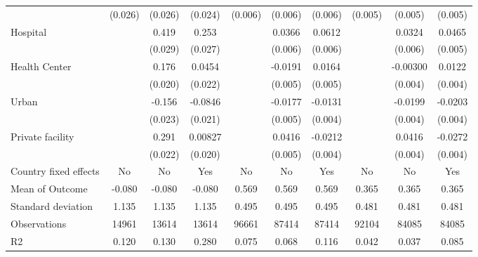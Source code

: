 {\begin{tabular}{l*{9}{c}}
                &  (0.026)         &  (0.026)         &  (0.024)         &  (0.006)         &  (0.006)         &  (0.006)         &  (0.005)         &  (0.005)         &  (0.005)         \\
Hospital        &                  &    0.419\sym{***}&    0.253\sym{***}&                  &   0.0366\sym{***}&   0.0612\sym{***}&                  &   0.0324\sym{***}&   0.0465\sym{***}\\
                &                  &  (0.029)         &  (0.027)         &                  &  (0.006)         &  (0.006)         &                  &  (0.006)         &  (0.005)         \\
Health Center   &                  &    0.176\sym{***}&   0.0454\sym{**} &                  &  -0.0191\sym{***}&   0.0164\sym{***}&                  & -0.00300         &   0.0122\sym{***}\\
                &                  &  (0.020)         &  (0.022)         &                  &  (0.005)         &  (0.005)         &                  &  (0.004)         &  (0.004)         \\
Urban           &                  &   -0.156\sym{***}&  -0.0846\sym{***}&                  &  -0.0177\sym{***}&  -0.0131\sym{***}&                  &  -0.0199\sym{***}&  -0.0203\sym{***}\\
                &                  &  (0.023)         &  (0.021)         &                  &  (0.005)         &  (0.004)         &                  &  (0.004)         &  (0.004)         \\
Private facility&                  &    0.291\sym{***}&  0.00827         &                  &   0.0416\sym{***}&  -0.0212\sym{***}&                  &   0.0416\sym{***}&  -0.0272\sym{***}\\
                &                  &  (0.022)         &  (0.020)         &                  &  (0.005)         &  (0.004)         &                  &  (0.004)         &  (0.004)         \\
\hline
Country fixed effects&       No         &       No         &      Yes         &       No         &       No         &      Yes         &       No         &       No         &      Yes         \\
Mean of Outcome &   -0.080         &   -0.080         &   -0.080         &    0.569         &    0.569         &    0.569         &    0.365         &    0.365         &    0.365         \\
Standard deviation&    1.135         &    1.135         &    1.135         &    0.495         &    0.495         &    0.495         &    0.481         &    0.481         &    0.481         \\
Observations    &    14961         &    13614         &    13614         &    96661         &    87414         &    87414         &    92104         &    84085         &    84085         \\
R2              &    0.120         &    0.130         &    0.280         &    0.075         &    0.068         &    0.116         &    0.042         &    0.037         &    0.085         \\
\hline\hline
\end{tabular}
}
